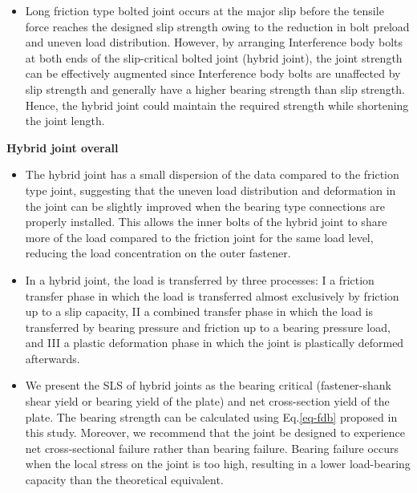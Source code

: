 \begin{itemize}
\item Long friction type bolted joint occurs at the major slip before the tensile force reaches the designed slip strength owing to the reduction in bolt preload and uneven load distribution. However, by arranging Interference body bolts at both ends of the slip-critical bolted joint (hybrid joint), the joint strength can be effectively augmented since Interference body bolts are unaffected by slip strength and generally have a higher bearing strength than slip strength. Hence, the hybrid joint could maintain the required strength while shortening the joint length.

\end{itemize}

\textbf{Hybrid joint overall}

\begin{itemize}

\item The hybrid joint has a small dispersion of the data compared to the friction type joint, suggesting that the uneven load distribution and deformation in the joint can be slightly improved when the bearing type connections are properly installed. This allows the inner bolts of the hybrid joint to share more of the load compared to the friction joint for the same load level, reducing the load concentration on the outer fastener.

\item In a hybrid joint, the load is transferred by three processes: \RN{1} a friction transfer phase in which the load is transferred almost exclusively by friction up to a slip capacity, \RN{2} a combined transfer phase in which the load is transferred by bearing pressure and friction up to a bearing pressure load, and \RN{3} a plastic deformation phase in which the joint is plastically deformed afterwards. 

\item We present the SLS of hybrid joints as the bearing critical (fastener-shank shear yield or bearing yield of the plate) and net cross-section yield of the plate. The bearing strength can be calculated using Eq.\ref{eq-fdb} proposed in this study. Moreover, we recommend that the joint be designed to experience net cross-sectional failure rather than bearing failure. Bearing failure occurs when the local stress on the joint is too high, resulting in a lower load-bearing capacity than the theoretical equivalent.

\end{itemize}



